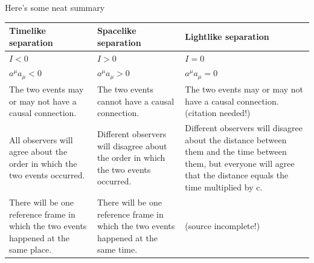 \documentclass[../../main.tex]{subfiles}
\begin{document}
Here's some neat summary
\begin{center}
        \begin{longtable}{ |p{}|p{} |p{}| }
            \hline
            Timelike separation&Spacelike separation&Lightlike separation\\
            \hline
            $I < 0$&$I > 0$&$I = 0$\\
            $a^\mu a_\mu<0$&$a^\mu a_\mu>0$&$a^\mu a_\mu=0$\\
            The two events may or may not have a causal connection.&The two events cannot have a causal
            connection.&The two events may or may not have a causal connection.(citation needed!)\\
            All observers will agree about the order in which the two events occurred.&Different observers will disagree about the order in which the two events occurred.&Different observers will disagree about the distance between them and the time between them, but everyone will agree that the distance equals the time multiplied by c.\\
            There will be one reference frame in which the two events happened at the same place.&There will be one reference frame in which the two events happened at the same time.&(source incomplete!)\\
            \hline
        \end{longtable}
\end{center}
\end{document}
